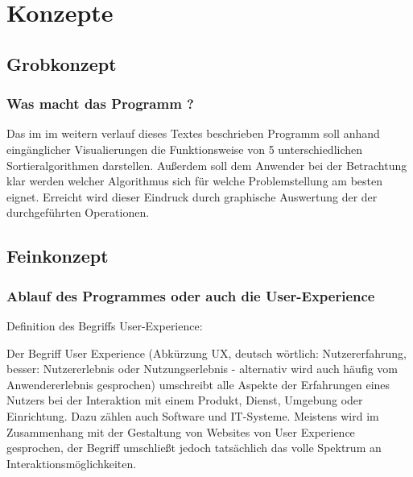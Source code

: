 \chapter{Konzepte}
\label{chap:concepts}
\section{ Grobkonzept }
\subsection{Was macht das Programm ?}

Das im im weitern verlauf dieses Textes beschrieben Programm soll anhand eingänglicher
Visualierungen die Funktionsweise von 5 unterschiedlichen Sortieralgorithmen
darstellen. Außerdem soll dem Anwender bei der Betrachtung klar werden welcher Algorithmus 
sich für welche Problemstellung am besten eignet. Erreicht wird dieser Eindruck durch graphische Auswertung der
der durchgeführten Operationen.

\section{ Feinkonzept }
\subsection{ Ablauf des Programmes oder auch die User-Experience }
Definition des Begriffs User-Experience:
\begin{munquote}
   Der Begriff User Experience (Abkürzung UX, deutsch wörtlich: Nutzererfahrung, besser: Nutzererlebnis oder Nutzungserlebnis - alternativ wird auch häufig vom Anwendererlebnis gesprochen) 
  umschreibt alle Aspekte der Erfahrungen eines Nutzers bei der Interaktion mit einem Produkt, Dienst, Umgebung oder Einrichtung. 
  Dazu zählen auch Software und IT-Systeme. Meistens wird im Zusammenhang mit der Gestaltung von Websites von User Experience gesprochen, der Begriff umschließt jedoch tatsächlich das volle Spektrum an Interaktionsmöglichkeiten.
\end{munquote}

